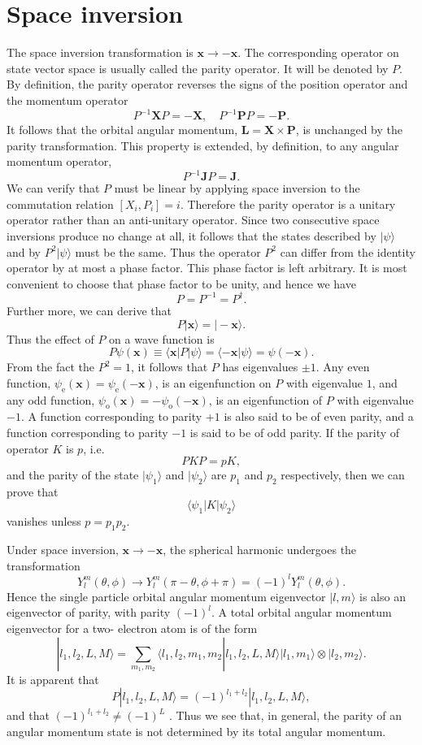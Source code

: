 \section{Space inversion}
The space inversion transformation is $\bm{x} \to -\bm{x}$. The corresponding operator on state vector space is usually called the parity operator. It will be denoted by $P$. By definition, the parity operator reverses the signs of the position operator and the momentum operator
\[P^{-1}\bm{X}P = -\bm{X} , \quad P^{-1}\bm{P}P = -\bm{P}.\]
It follows that the orbital angular momentum, $\bm{L} = \bm{X}\times\bm{P}$, is unchanged by the parity transformation. This property is extended, by definition, to any angular momentum operator,
\[P^{-1}\bm{J}P = \bm{J}.\]
We can verify that $P$ must be linear by applying space inversion to the commutation relation $[X_i,P_i] = i$. Therefore the parity operator is a unitary operator rather than an anti-unitary operator. Since two consecutive space inversions produce no change at all, it follows that the states described by $|\psi\rangle$ and by $P^2|\psi\rangle$ must be the same. Thus the
operator $P^2$ can differ from the identity operator by at most a phase factor. This phase factor is left arbitrary. It is most convenient to choose that phase factor to be unity, and hence we have
\[P = P^{-1} = P^{\dagger}.\]
Further more, we can derive that
\[P|\bm{x}\rangle = |-\bm{x}\rangle.\]
Thus the effect of $P$ on a wave function is
\[P\psi(\bm{x}) \equiv \langle \bm{x} | P | \psi\rangle = \langle -\bm{x} | \psi\rangle = \psi(-\bm{x}).\]
From the fact the $P^2=1$, it follows that $P$ has eigenvalues $\pm 1$. Any even function, $\psi_{\mathrm{e}}(\bm{x}) = \psi_{\mathrm{e}}(-\bm{x})$, is an eigenfunction on $P$ with eigenvalue $1$, and any odd function, $\psi_{\mathrm{o}}(\bm{x}) = -\psi_{\mathrm{o}}(-\bm{x})$, is an eigenfunction of $P$ with eigenvalue $-1$.
A function corresponding to parity $+1$ is also said to be of even parity, and a function corresponding to parity $-1$ is said to be of odd parity.
If the parity of operator $K$ is $p$, i.e. 
\[PKP = pK,\] 
and the parity of the state $|\psi_1\rangle$ and $|\psi_2\rangle$ are $p_1$ and $p_2$ respectively, then we can prove that 
\[\langle \psi_1 | K | \psi_2 \rangle \]
vanishes unless $p = p_1 p_2$.

\begin{example}
Under space inversion, $\bm{x} \to -\bm{x}$, the spherical harmonic undergoes the transformation
\[Y_l^m(\theta,\phi) \to Y_l^m(\pi-\theta,\phi+\pi) = (-1)^l Y_l^m(\theta,\phi).\]
Hence the single particle orbital angular momentum eigenvector $|l,m\rangle$ is also an eigenvector of parity, with parity $(-1)^l$.
A total orbital angular momentum eigenvector for a two-
electron atom is of the form
\[|l_1,l_2,L,M\rangle = \sum_{m_1,m_2}  \langle l_1,l_2,m_1,m_2 | l_1,l_2,L,M\rangle |l_1,m_1\rangle \otimes |l_2,m_2\rangle.\]
It is apparent that
\[P|l_1,l_2,L,M\rangle = (-1)^{l_1+l_2}| l_1,l_2,L,M\rangle ,\]
and that $(-1)^{l_1+l_2} \neq (-1)^{L}$ . Thus we see that, in general, the parity of an angular momentum state is not determined by its total angular momentum.
\end{example}

